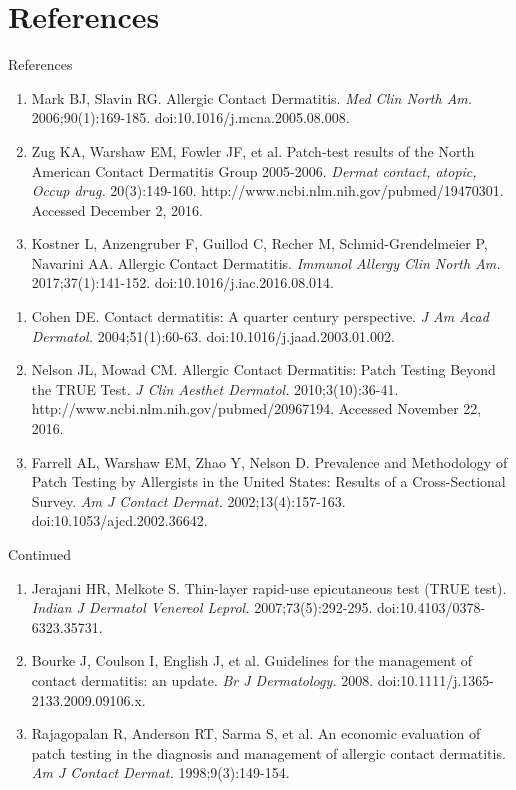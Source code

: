 \documentclass[11pt]{beamer}
\newcounter{saveenumi}
\newcommand{\seti}{\setcounter{saveenumi}{\value{enumi}}}
\newcommand{\conti}{\setcounter{enumi}{\value{saveenumi}}}
\begin{document}
\section{References}
\begin{frame}{References}
\begin{enumerate}
\item  Mark BJ, Slavin RG. Allergic Contact Dermatitis. \textit{ Med Clin North Am.} 2006;90(1):169-185. doi:10.1016/j.mcna.2005.08.008.
\item Zug KA, Warshaw EM, Fowler JF, et al. Patch-test results of the North American Contact Dermatitis Group 2005-2006. \textit{Dermat  contact, atopic, Occup drug.} 20(3):149-160. http://www.ncbi.nlm.nih.gov/pubmed/19470301. Accessed December 2, 2016.
\item Kostner L, Anzengruber F, Guillod C, Recher M, Schmid-Grendelmeier P, Navarini AA. Allergic Contact Dermatitis. \textit{Immunol Allergy Clin North Am.} 2017;37(1):141-152. doi:10.1016/j.iac.2016.08.014.
\seti


\end{enumerate}
\end{frame}

\begin{frame}
\begin{enumerate}
\conti
\item Cohen DE. Contact dermatitis: A quarter century perspective. \textit{J Am Acad Dermatol.} 2004;51(1):60-63. doi:10.1016/j.jaad.2003.01.002.
\item Nelson JL, Mowad CM. Allergic Contact Dermatitis: Patch Testing Beyond the TRUE Test. \textit{J Clin Aesthet Dermatol.} 2010;3(10):36-41. http://www.ncbi.nlm.nih.gov/pubmed/20967194. Accessed November 22, 2016.
\item Farrell AL, Warshaw EM, Zhao Y, Nelson D. Prevalence and Methodology of Patch Testing by Allergists in the United States: Results of a Cross-Sectional Survey. \textit{Am J Contact Dermat.} 2002;13(4):157-163. doi:10.1053/ajcd.2002.36642.

\seti
\end{enumerate}
\end{frame}

\begin{frame}{Continued}
\begin{enumerate}
\conti 
\item Jerajani HR, Melkote S. Thin-layer rapid-use epicutaneous test (TRUE test). \textit{Indian J Dermatol Venereol Leprol.} 2007;73(5):292-295. doi:10.4103/0378-6323.35731.
\item Bourke J, Coulson I, English J, et al. Guidelines for the management of contact dermatitis: an update. \textit{Br J Dermatology.} 2008. doi:10.1111/j.1365-2133.2009.09106.x.
\item Rajagopalan R, Anderson RT, Sarma S, et al. An economic evaluation of patch testing in the diagnosis and management of allergic contact dermatitis. \textit{Am J Contact Dermat.} 1998;9(3):149-154. 
\seti
\end{enumerate}

\end{frame}
\end{document}
